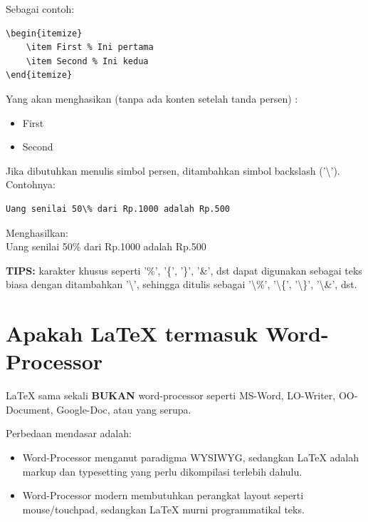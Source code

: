 \documentclass{book} %
\begin{document}
    Sebagai contoh:

    \begin{verbatim}
\begin{itemize}
    \item First % Ini pertama
    \item Second % Ini kedua
\end{itemize}
    \end{verbatim}

    Yang akan menghasikan (tanpa ada konten setelah tanda persen) :

    \begin{itemize}
        \item First %
        \item Second %
    \end{itemize}

	\newpage
    Jika dibutuhkan menulis simbol persen, ditambahkan simbol backslash ('\textbackslash').
    Contohnya:

    \begin{verbatim}
Uang senilai 50\% dari Rp.1000 adalah Rp.500
    \end{verbatim}

    Menghasilkan: \\
    Uang senilai 50\% dari Rp.1000 adalah Rp.500

    \bigskip

    \textbf{TIPS:} karakter khusus seperti '\%', '\{', '\}', '\&', dst dapat digunakan sebagai teks biasa dengan ditambahkan
    '\textbackslash', sehingga ditulis sebagai '\textbackslash\%', '\textbackslash\{', '\textbackslash\}', '\textbackslash\&', dst.

    \section{Apakah \LaTeX{} termasuk Word-Processor}

    \LaTeX{} sama sekali \textbf{BUKAN} word-processor seperti MS-Word, LO-Writer, OO-Document, Google-Doc, atau yang serupa.

    \bigskip

    Perbedaan mendasar adalah:
    \begin{itemize}
        \item Word-Processor menganut paradigma WYSIWYG,
        sedangkan \LaTeX{} adalah markup dan typesetting yang perlu dikompilasi terlebih dahulu.

        \item Word-Processor modern membutuhkan perangkat layout seperti mouse/touchpad,
        sedangkan \LaTeX{} murni programmatikal teks.
    \end{itemize}
\end{document}
